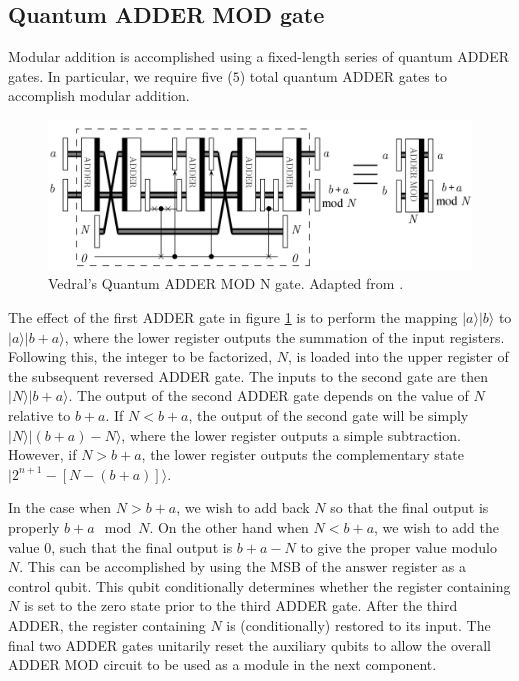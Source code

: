 \documentclass{article}
\begin{document}
\subsection{Quantum ADDER MOD gate}
\label{sec:vedralADDERMOD}
Modular addition is accomplished using a fixed-length series of quantum ADDER gates. In particular, we require five ($5$) total quantum ADDER gates to accomplish modular addition. 

\begin{figure}[!htbp]
\centering
\includegraphics[width=1\textwidth]
{vedraladdermod.png}
\captionsetup{format = hang}
\caption{Vedral's Quantum ADDER MOD N gate. Adapted from \cite{VBE95}.}
\label{fig:vedralADDERMOD}
\end{figure}

The effect of the first ADDER gate in figure \ref{fig:vedralADDERMOD} is to perform the mapping $|a\rangle |b\rangle$ to $|a\rangle |b+a\rangle$, where the lower register outputs the summation of the input registers. Following this, the integer to be factorized, $N$, is loaded into the upper register of the subsequent reversed ADDER gate. The inputs to the second gate are then $|N\rangle |b+a\rangle$. The output of the second ADDER gate depends on the value of $N$ relative to $b+a$. If $N<b+a$, the output of the second gate will be simply $|N\rangle|(b+a)-N\rangle$, where the lower register outputs a simple subtraction. However, if $N>b+a$, the lower register outputs the complementary state $|2^{n+1} - [N - (b+a)]\rangle$.  

In the case when $N > b+a$, we wish to add back $N$ so that the final output is properly $b+a \mod N$. On the other hand when $N<b+a$, we wish to add the value 0, such that the final output is $b+a - N$ to give the proper value modulo $N$. This can be accomplished by using the MSB of the answer register as a control qubit. This qubit conditionally determines whether the register containing $N$ is set to the zero state prior to the third ADDER gate. After the third ADDER, the register containing $N$ is (conditionally) restored to its input. The final two ADDER gates unitarily reset the auxiliary qubits to allow the overall ADDER MOD circuit to be used as a module in the next component. 
\end{document}
